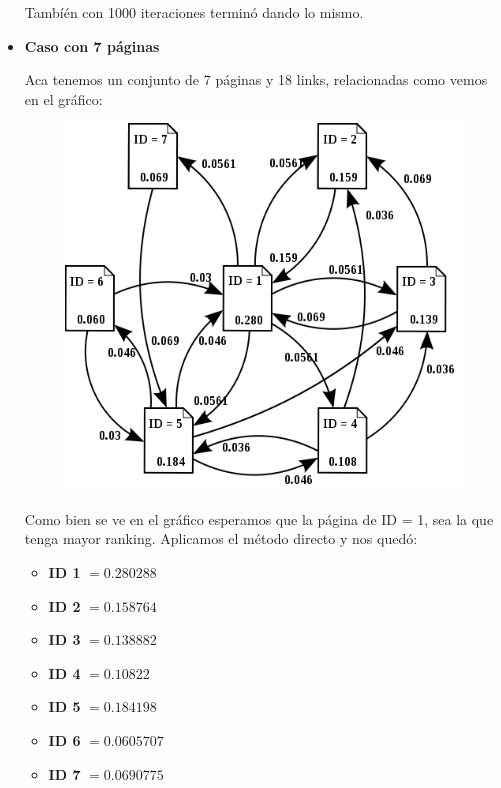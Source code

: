 \begin{itemize}
        Tambíén con 1000 iteraciones terminó dando lo mismo.

        \item \textbf{Caso con 7 páginas}

	Aca tenemos un conjunto de 7 páginas y 18 links, relacionadas como vemos en el gráfico:
        \newpage
            \begin{figure}
                \centering
                \includegraphics[scale=0.60]{../graficos/507px-Linkstruct3.png}
                \label{fig: Caso con 7 Páginas}
            \end{figure}

        Como bien se ve en el gráfico esperamos que la página de ID = 1, sea la que tenga mayor ranking. Aplicamos el método directo y nos quedó:

        \begin{itemize}
          \item \textbf{ID 1} $= 0.280288$
          \item \textbf{ID 2} $= 0.158764$
          \item \textbf{ID 3} $= 0.138882$
          \item \textbf{ID 4} $= 0.10822$
          \item \textbf{ID 5} $= 0.184198$
          \item \textbf{ID 6} $= 0.0605707$
          \item \textbf{ID 7} $= 0.0690775$
        \end{itemize}


\end{itemize}
